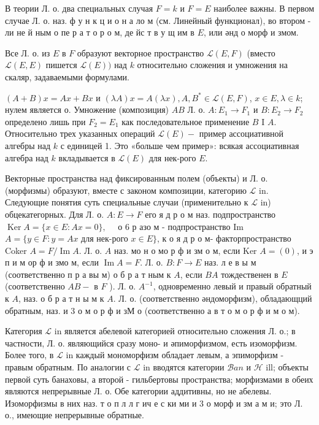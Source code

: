 \documentclass[10pt]{article}
\begin{document}
В теории Л. о. два специальных случая $F=k$ и $F=E$ наиболее важны. В первом случае Л. о. наз. ф у н к ц и о н а ло м (см. Линейный функционал), во втором - ли не й ным о пе р а т о р о м, де йс т в у щ им в $E$, или әнд о морф и змом.



Все Л. о. из $E$ в $F$ образуют векторное пространство $\mathscr{L}(E, F)$ (вместо $\mathscr{L}(E, E)$ пишется $\mathscr{L}(E))$ над $k$ относительно сложения и умножения на скаляр, задаваемыми формулами.



$(A+B) x=A x+B x$ и $(\lambda A) x=A(\lambda x), A, B^{*} \in \mathscr{L}(E, F)$, $x \in E, \lambda \in k$; нулем является о. Умножение (композиция) $A B$ Л. о. $A: E_{1} \rightarrow F_{1}$ и $B: E_{2} \rightarrow F_{2}$ определено лишь при $F_{2}=E_{1}$ как последовательное применение $B$ I $A$. Относительно трех указанных операций $\mathscr{L}(E)-$ пример ассоциативной алгебры над $k$ с единицей 1. Это «больше чем пример»: всякая ассоциативная алгебра над $k$ вкладывается в $\mathscr{L}(E)$ для нек-рого $E$.



Векторные пространства над фиксированным полем (объекты) и Л. о. (морфизмы) образуют, вместе с законом композиции, категорию $\mathscr{L}$ in. Следующие понятия суть специальные случаи (применительно к $\mathscr{L}$ in) обцекатегорных. Для Л. о. $A: E \rightarrow F$ его я д р о м наз. подпространство $\operatorname{Ker} A=\{x \in E: A x=0\}, \quad$ о 6 р азо м - подпространство Im $A=\{y \in F: y=A x$ для нек-рого $x \in E\}$, к о я д р о м- факторпространство Coker $A=F / \operatorname{Im} A$. Л. о. $A$ наз. мо н о мо р ф и зм о м, если Ker $A=(0)$, и э п и м ор ф и змо м, если $\operatorname{Im} A=F$. Л. о. $B: F \rightarrow E$ наз. л е в ы м (соответственно п р а вы м) о б р а т ным к $A$, если $B A$ тождественен в $E$ (соответственно $A B-$ в $F$ ). Л. о. $A^{-1}$, одновременно левый и правый обратный к $A$, наз. о б р а т н ы м к $A$. Л. о. (соответственно әндоморфизм), обладающций обратным, наз. и 3 о м о р ф и зМ о (соответственно а в т о м о р ф и м о м).



Категория $\mathscr{L}$ in является абелевой категорией относительно сложения Л. о.; в частности, Л. о. являющийся сразу моно- и әпиморфизмом, есть изоморфизм. Более того, в $\mathscr{L}$ in каждый мономорфизм обладает левым, а эпиморфизм - правым обратным. По аналогии с $\mathscr{L}$ in вводятся категории $\mathscr{B} a n$ и $\mathscr{H}$ ill; объекты первой суть банаховы, а второй - гильбертовы пространства; морфизмами в обеих являются непрерывные Л. о. Обе категории аддитивны, но не абелевы. Изоморфизмы в них наз. т о п л л г ич е с ки ми и 3 о морф и зм а м и; это Л. о., имеющие непрерывные обратные.
\end{document}
